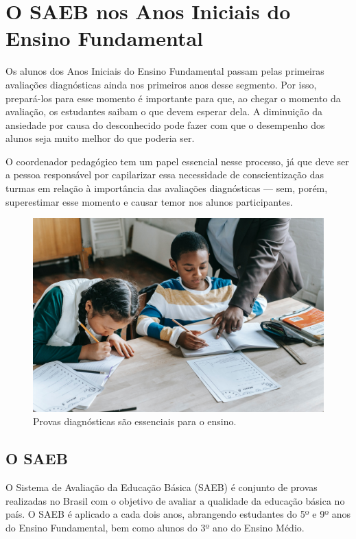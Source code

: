 \captionsetup{justification=raggedright, singlelinecheck=false}

\section{O SAEB nos Anos Iniciais do Ensino
Fundamental}

Os alunos dos Anos Iniciais do Ensino Fundamental passam pelas primeiras
avaliações diagnósticas ainda nos primeiros anos desse segmento. Por
isso, prepará-los para esse momento é importante para que, ao chegar o
momento da avaliação, os estudantes saibam o que devem esperar dela. A
diminuição da ansiedade por causa do desconhecido pode fazer com que o
desempenho dos alunos seja muito melhor do que poderia ser.

O coordenador pedagógico tem um papel essencial nesse processo, já que
deve ser a pessoa responsável por capilarizar essa necessidade de
conscientização das turmas em relação à importância das avaliações
diagnósticas --- sem, porém, superestimar esse momento e causar temor
nos alunos participantes.

\begin{figure}
\centering
\includegraphics[width=\textwidth]{./imgs/Imagem001.jpg}
\caption{Provas diagnósticas são essenciais para o ensino.}
\end{figure}

\subsection{O SAEB}\label{o-saeb}

O Sistema de Avaliação da Educação Básica (SAEB) é conjunto de provas
realizadas no Brasil com o objetivo de avaliar a qualidade da educação
básica no país. O SAEB é aplicado a cada dois anos, abrangendo
estudantes do 5º e 9º anos do Ensino Fundamental, bem como alunos do 3º
ano do Ensino Médio.


